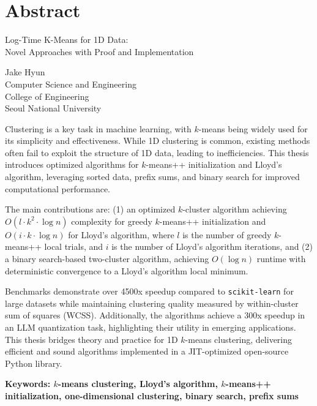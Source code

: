 \chapter*{Abstract}
\vspace*{-1.1cm}
{
\centering
\fontsize{22pt}{22pt}\selectfont Log-Time K-Means for 1D Data: \\
\fontsize{18pt}{20pt}\selectfont Novel Approaches with Proof and Implementation \\
}

\vspace*{0.8cm}

{
\flushright
\fontsize{14pt}{16pt}\selectfont
Jake Hyun \\
Computer Science and Engineering \\ 
College of Engineering \\
Seoul National University \\
}
\vspace*{0.8cm}

Clustering is a key task in machine learning, with $k$-means being widely used for its simplicity and effectiveness. While 1D clustering is common, existing methods often fail to exploit the structure of 1D data, leading to inefficiencies. This thesis introduces optimized algorithms for $k$-means++ initialization and Lloyd's algorithm, leveraging sorted data, prefix sums, and binary search for improved computational performance.

The main contributions are: (1) an optimized \(k\)-cluster algorithm achieving \(O(l \cdot k^2 \cdot \log n)\) complexity for greedy $k$-means++ initialization and \(O(i \cdot k \cdot \log n)\) for Lloyd's algorithm, where \(l\) is the number of greedy $k$-means++ local trials, and \(i\) is the number of Lloyd's algorithm iterations, and (2) a binary search-based two-cluster algorithm, achieving \(O(\log n)\) runtime with deterministic convergence to a Lloyd’s algorithm local minimum.

Benchmarks demonstrate over 4500x speedup compared to \texttt{scikit-learn} for large datasets while maintaining clustering quality measured by within-cluster sum of squares (WCSS). Additionally, the algorithms achieve a 300x speedup in an LLM quantization task, highlighting their utility in emerging applications. This thesis bridges theory and practice for 1D $k$-means clustering, delivering efficient and sound algorithms implemented in a JIT-optimized open-source Python library.

\vfill
\textbf{Keywords: $k$-means clustering, Lloyd’s algorithm, $k$-means++ initialization, one-dimensional clustering, binary search, prefix sums}
